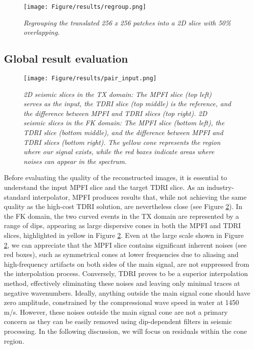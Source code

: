 \begin{figure}[ht]
	\centering
	\texttt{[image: Figure/results/regroup.png]} %
	\caption{\textit{Regrouping the translated 256 x 256 patches into a 2D slice with 50\% overlapping.}}
	\label{fig:regroup}
\end{figure}

\subsection{Global result evaluation}
\begin{figure}[ht]
	\centering
	\texttt{[image: Figure/results/pair\_input.png]} %
	\caption{\textit{2D seismic slices in the TX domain: The MPFI slice (top left) serves as the input, the TDRI slice (top middle) is the reference, and the difference between MPFI and TDRI slices (top right). 2D seismic slices in the FK domain: The MPFI slice (bottom left), the TDRI slice (bottom middle), and the difference between MPFI and TDRI slices (bottom right). The yellow cone represents the region where our signal exists, while the red boxes indicate areas where noises can appear in the spectrum.}}
	\label{fig:pair_input}
\end{figure}

\noindent Before evaluating the quality of the reconstructed images, it is essential to understand the input MPFI slice and the target TDRI slice. As an industry-standard interpolator, MPFI produces results that, while not achieving the same quality as the high-cost TDRI solution, are nevertheless close (see Figure \ref{fig:pair_input}). In the FK domain, the two curved events in the TX domain are represented by a range of dips, appearing as large dispersive cones in both the MPFI and TDRI slices, highlighted in yellow in Figure \ref{fig:pair_input}. Even at the large scale shown in Figure \ref{fig:pair_input}, we can appreciate that the MPFI slice contains significant inherent noises (see red boxes), such as symmetrical cones at lower frequencies due to aliasing and high-frequency artifacts on both sides of the main signal, are not suppressed from the interpolation process. Conversely, TDRI proves to be a superior interpolation method, effectively eliminating these noises and leaving only minimal traces at negative wavenumbers. Ideally, anything outside the main signal cone should have zero amplitude, constrained by the compressional wave speed in water at 1450 m/s. However, these noises outside the main signal cone are not a primary concern as they can be easily removed using dip-dependent filters in seismic processing. In the following discussion, we will focus on residuals within the cone region.\\

